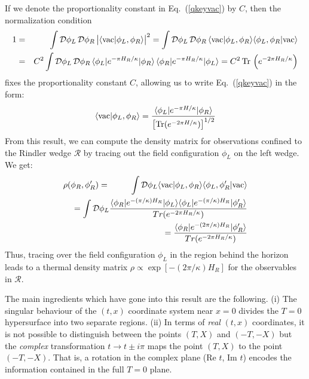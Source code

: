 \documentclass[12pt]{iopart}
\def\eq#1{{Eq.~(\ref{#1})}}
\begin{document}
If we denote the proportionality constant in \eq{qkeyvac} by $C$, then the normalization condition
   \begin{eqnarray}
 1&=& \int \mathcal{D} \phi_L\, \mathcal{D} \phi_R\, \big|\langle {\rm vac} |\phi_L , \phi_R \rangle \big|^2 
= \int \mathcal{D} \phi_L\, \mathcal{D} \phi_R \, \langle {\rm vac} |\phi_L , \phi_R \rangle  
\langle \phi_{L} , \phi_{R} |{\rm vac}\rangle\nonumber\\
&=& C^2 \int \mathcal{D} \phi_L\, \mathcal{D} \phi_R\, \langle\phi_L|e^{-\pi H_R/\kappa} | \phi_R \rangle \, \langle \phi_R|e^{-\pi H_R/\kappa} | \phi_L\rangle
= C^2 \, {\rm Tr}\, \left(e^{-2\pi H_R/\kappa}\right)\nonumber\\
\end{eqnarray}  
     fixes the proportionality constant $C$, allowing us to write \eq{qkeyvac} in the  form: 
\begin{equation}
\langle {\rm vac} |\phi_L , \phi_R \rangle = \frac{\langle \phi_L \vert e^{-\pi H/\kappa } \vert \phi_R \rangle}{ \left[ {\rm Tr}(e^{-2 \pi H/\kappa })\right]^{1/2} } \label{eqn:fifteen}
\end{equation}
From this result, we can compute the density matrix for observations confined to the Rindler wedge $\mathcal{R}$ by tracing out the field configuration $\phi_L$ on the left wedge.
We get:
\begin{eqnarray}
\rho (\phi_R,\phi'_R)
 &=& \int \mathcal{D}\phi_L \langle {\rm vac} \vert \phi_L, \phi_R \rangle  \langle   \phi_L,\phi'_R \vert {\rm vac} \rangle 
 \nonumber \\
&&\hskip -5em = \int \mathcal{D}\phi_L  \frac{  \langle \phi_R \vert e^{-(\pi/\kappa) H_R } \vert \phi_L \rangle \langle \phi_L \vert e^{-(\pi/\kappa) H_R}\vert \phi'_R \rangle}{Tr(e^{-2\pi H_R/\kappa })}\nonumber\\
&&\hskip -5em= \frac{\langle \phi_R \vert e^{-(2\pi/\kappa) H_R } \vert \phi'_R \rangle  }{Tr(e^{-2\pi H_R/\kappa })} \label{eqn:twentytwo}
\end{eqnarray}
Thus, tracing over the field configuration $\phi_L$ in the region behind the horizon leads to a thermal density
matrix $\rho \propto \exp[-(2\pi/\kappa )H_R]$ for the observables in $\mathcal{R}$.


The main ingredients which have gone into this 
   result are the following. (i) The singular behaviour of the $(t,x)$ coordinate system
   near $x=0$ divides the $T=0$ hypersurface into two separate regions.
   (ii) In terms of \emph{real} $(t,x)$ coordinates, it is not possible to distinguish between the points
   $(T,X)$ and $(-T,-X)$ but the \emph{complex} transformation $t\to t\pm i\pi$ maps the point
   $(T,X)$ to the point $(-T,-X)$. That is, a rotation in the complex  plane (Re $t$, Im $t$)
   encodes the information contained in the full $T=0$ plane. 
 
\end{document}
